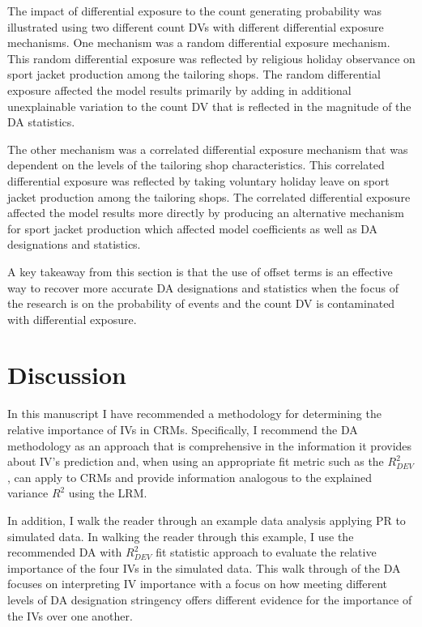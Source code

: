 \documentclass[ShortAfour,times,sageapa]{sagej}
\begin{document}
	The impact of differential exposure to the count generating probability was illustrated using two different count DVs with different differential exposure mechanisms.
	One mechanism was a random differential exposure mechanism.
	This random differential exposure was reflected by religious holiday observance on sport jacket production among the tailoring shops.
	The random differential exposure affected the model results primarily by adding in additional unexplainable variation to the count DV that is reflected in the magnitude of the DA statistics.
	
	The other mechanism was a correlated differential exposure mechanism that was dependent on the levels of the tailoring shop characteristics.
	This correlated differential exposure was reflected by taking voluntary holiday leave on sport jacket production among the tailoring shops.
	The correlated differential exposure affected the model results more directly by producing an alternative mechanism for sport jacket production which affected model coefficients as well as DA designations and statistics.
	
	A key takeaway from this section is that the use of offset terms is an effective way to recover more accurate DA designations and statistics when the focus of the research is on the probability of events and the count DV is contaminated with differential exposure.

	
\section{Discussion}

	In this manuscript I have recommended a methodology for determining the relative importance of IVs in CRMs.
	Specifically, I recommend the DA methodology as an approach that is comprehensive in the information it provides about IV's prediction and, when using an appropriate fit metric such as the $R^2_{DEV}$, can apply to CRMs and provide information analogous to the explained variance $R^2$ using the LRM.
	
	In addition, I walk the reader through an example data analysis applying PR to simulated data. 
	In walking the reader through this example, I use the recommended DA with $R^2_{DEV}$ fit statistic approach to evaluate the relative importance of the four IVs in the simulated data.
	This walk through of the DA focuses on interpreting IV importance with a focus on how meeting different levels of DA designation stringency offers different evidence for the importance of the IVs over one another.
	
\end{document}
